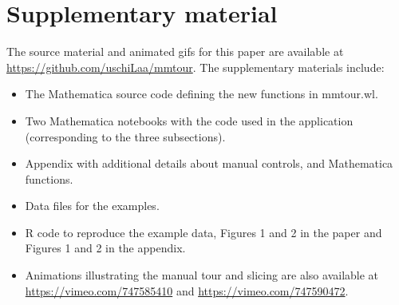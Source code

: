\documentclass[]{interact}
\theoremstyle{plain}%
\theoremstyle{definition}
\theoremstyle{remark}
\providecommand{\tightlist}{%
  \setlength{\itemsep}{0pt}\setlength{\parskip}{0pt}}
\def\tightlist{}
\begin{document}
\hypertarget{supplementary-material}{%
\section*{Supplementary material}\label{supplementary-material}}

The source material and animated gifs for this paper are available at
\url{https://github.com/uschiLaa/mmtour}. The supplementary materials
include:

\begin{itemize}
\tightlist
\item
  The Mathematica source code defining the new functions in mmtour.wl.
\item
  Two Mathematica notebooks with the code used in the application
  (corresponding to the three subsections).
\item
  Appendix with additional details about manual controls, and
  Mathematica functions.
\item
  Data files for the examples.
\item
  R code to reproduce the example data, Figures 1 and 2 in the paper and
  Figures 1 and 2 in the appendix.
\item
  Animations illustrating the manual tour and slicing are also available
  at \url{https://vimeo.com/747585410} and
  \url{https://vimeo.com/747590472}.
\end{itemize}



\end{document}
